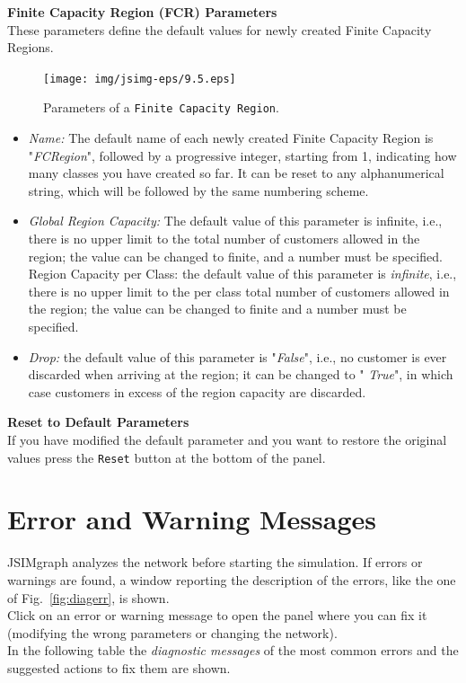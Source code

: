 \noindent \textbf{Finite Capacity Region (FCR) Parameters}\\
These parameters define the default values for newly created
Finite Capacity Regions.\\
\begin{figure}[htb]
    \begin{center}
        \texttt{[image: img/jsimg-eps/9.5.eps]}
    \end{center}
    \caption{Parameters of a \texttt{Finite Capacity Region}.}
    \label{fig:parfcreg}
\end{figure}
\begin{itemize}
\item \emph{Name:} The default name of each newly created Finite
Capacity Region is "\emph{FCRegion}", followed by a progressive
integer, starting from 1, indicating how many classes you have
created so far. It can be reset to any alphanumerical string,
which will be followed by the same numbering scheme. \item
\emph{Global Region Capacity:} The default value of this parameter
is infinite, i.e., there is no upper limit to the total number of
customers allowed in the region; the value can be changed to
finite, and a number must be specified. Region Capacity per Class:
the default value of this parameter is \emph{infinite}, i.e.,
there is no upper limit to the per class total number of customers
allowed in the region; the value can be changed to finite and a
number must be specified. \item \emph{Drop:} the default value of
this parameter is "\emph{False}", i.e., no customer is ever
discarded when arriving at the region; it can be changed to "
\emph{True}", in which case customers in excess of the region
capacity are discarded.
\end{itemize}

\noindent \textbf{Reset to Default Parameters}\\
 If you have modified the
default parameter and you want to restore the original values
press the \texttt{Reset} button at the bottom of the panel.


\section{Error and Warning Messages}
\label{erwar}

JSIMgraph analyzes the network before starting the simulation. If
errors or warnings are found, a window reporting the description
of the errors, like the one of Fig.~\ref{fig:diagerr}, is shown.\\
Click on an error or warning message to open the panel where you
can fix it (modifying the wrong parameters or changing the network).\\
In the following table the \emph{diagnostic messages} of the most
common errors and the suggested actions to fix them are shown.

